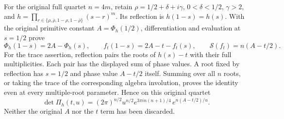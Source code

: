 For the original full quartet $n=4m$, retain
$\rho=1/2+\delta+i\gamma$, $0<\delta<1/2$, $\gamma>2$, and
$h=\prod_{r\in\{\rho,\bar\rho,1-\rho,1-\bar\rho\}}(s-r)^m$.
Its reflection is $h(1-s)=h(s)$. With the original primitive constant
$A=\Phi_h(1/2)$, differentiation and evaluation at $s=1/2$ prove
\[
 \Phi_h(1-s)=2A-\Phi_h(s),\qquad
 f_t(1-s)=2A-t-f_t(s),\qquad
 \mathcal S(f_t)=n(A-t/2).
 \tag{PDE12}
\]
For the trace assertion, reflection pairs the roots of $h(s)-t$ with
their full multiplicities. Each pair has the displayed sum of phase
values. A root fixed by reflection has $s=1/2$ and phase value
$A-t/2$ itself. Summing over all $n$ roots, or taking the trace of the
corresponding algebra involution, proves the identity even at every
multiple-root parameter. Hence on this original quartet
\[
 \det\Pi_h(t,u)
  =(2\pi)^{n/2}u^{n/2}
       e^{3\pi i n(n+1)/4}\,e^{n(A-t/2)/u}.
 \tag{PDE13}
\]
Neither the original $A$ nor the $t$ term has been discarded.

